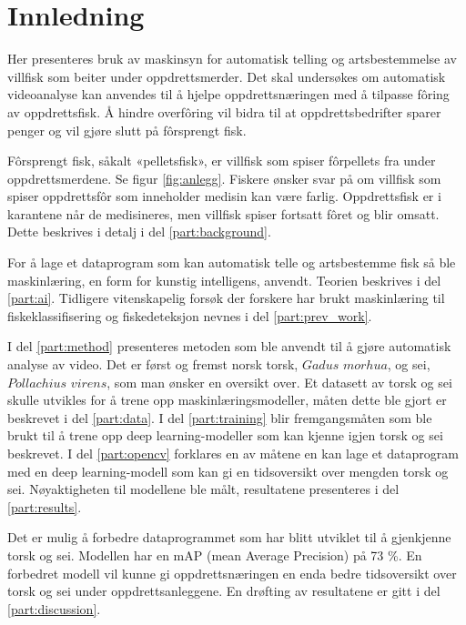 \section{Innledning}




Her presenteres bruk av maskinsyn for automatisk telling og artsbestemmelse av villfisk som beiter under oppdrettsmerder. Det skal undersøkes om automatisk videoanalyse kan anvendes til å hjelpe oppdrettsnæringen med å tilpasse fôring av oppdrettsfisk. Å hindre overfôring vil bidra til at oppdrettsbedrifter sparer penger og vil gjøre slutt på fôrsprengt fisk.

Fôrsprengt fisk, såkalt «pelletsfisk», er villfisk som spiser fôrpellets fra under oppdrettsmerdene. Se figur \ref{fig:anlegg}. Fiskere ønsker svar på om villfisk som spiser oppdrettsfôr som inneholder medisin kan være farlig. Oppdrettsfisk er i karantene når de medisineres, men villfisk spiser fortsatt fôret og blir omsatt. Dette beskrives i detalj i del \ref{part:background}.

For å lage et dataprogram som kan automatisk telle og artsbestemme fisk så ble maskinlæring, en form for kunstig intelligens, anvendt. Teorien beskrives i del \ref{part:ai}. Tidligere vitenskapelig forsøk der forskere har brukt maskinlæring til fiskeklassifisering og fiskedeteksjon nevnes i del \ref{part:prev_work}. 

I del \ref{part:method} presenteres metoden som ble anvendt til å gjøre automatisk analyse av video. Det er først og fremst norsk torsk, $Gadus$ $morhua$, og sei, $Pollachius$ $virens$, som man ønsker en oversikt over. Et datasett av torsk og sei skulle utvikles for å trene opp maskinlæringsmodeller, måten dette ble gjort er beskrevet i del \ref{part:data}. I del \ref{part:training} blir fremgangsmåten som ble brukt til å trene opp deep learning-modeller som kan kjenne igjen torsk og sei beskrevet. I del \ref{part:opencv} forklares en av måtene en kan lage et dataprogram med en deep learning-modell som kan gi en tidsoversikt over mengden torsk og sei. Nøyaktigheten til modellene ble målt, resultatene presenteres i del \ref{part:results}.

Det er mulig å forbedre dataprogrammet som har blitt utviklet til å gjenkjenne torsk og sei. Modellen har en mAP (mean Average Precision) på 73 \%. En forbedret modell vil kunne gi oppdrettsnæringen en enda bedre tidsoversikt over torsk og sei under oppdrettsanleggene. En drøfting av resultatene er gitt i del \ref{part:discussion}.

